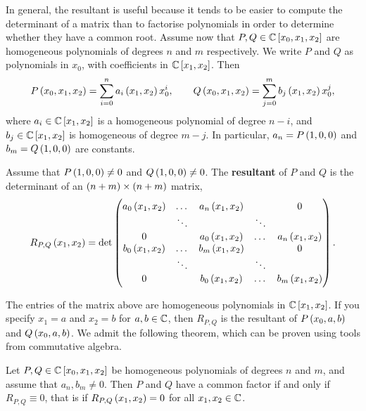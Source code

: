 
In general, the resultant is useful because it tends to be easier to compute the determinant of a matrix than to factorise polynomials in order to determine whether they have a common root. Assume now that $ P, Q \in \C\sbr{x_0, x_1, x_2} $ are homogeneous polynomials of degrees $ n $ and $ m $ respectively. We write $ P $ and $ Q $ as polynomials in $ x_0 $, with coefficients in $ \C\sbr{x_1, x_2} $. Then
$$ P\br{x_0, x_1, x_2} = \sum_{i = 0}^n a_i\br{x_1, x_2}x_0^i, \qquad Q\br{x_0, x_1, x_2} = \sum_{j = 0}^m b_j\br{x_1, x_2}x_0^j, $$
where $ a_i \in \C\sbr{x_1, x_2} $ is a homogeneous polynomial of degree $ n - i $, and $ b_j \in \C\sbr{x_1, x_2} $ is homogeneous of degree $ m - j $. In particular, $ a_n = P\br{1, 0, 0} $ and $ b_m = Q\br{1, 0, 0} $ are constants.

\begin{definition}
\label{def:9.5}
Assume that $ P\br{1, 0, 0} \ne 0 $ and $ Q\br{1, 0, 0} \ne 0 $. The \textbf{resultant} of $ P $ and $ Q $ is the determinant of an $ \br{n + m} \times \br{n + m} $ matrix,
$$ R_{P, Q}\br{x_1, x_2} = \det
\begin{pmatrix}
a_0\br{x_1, x_2} & \dots & a_n\br{x_1, x_2} & & 0 \\
& \ddots & & \ddots & \\
0 & & a_0\br{x_1, x_2} & \dots & a_n\br{x_1, x_2} \\
b_0\br{x_1, x_2} & \dots & b_m\br{x_1, x_2} & & 0 \\
& \ddots & & \ddots & \\
0 & & b_0\br{x_1, x_2} & \dots & b_m\br{x_1, x_2}
\end{pmatrix}.
$$
\end{definition}

The entries of the matrix above are homogeneous polynomials in $ \C\sbr{x_1, x_2} $. If you specify $ x_1 = a $ and $ x_2 = b $ for $ a, b \in \mathbb{C} $, then $ R_{P, Q} $ is the resultant of $ P\br{x_0, a, b} $ and $ Q\br{x_0, a, b} $. We admit the following theorem, which can be proven using tools from commutative algebra.

\begin{theorem}
\label{thm:9.6}
Let $ P, Q \in \C\sbr{x_0, x_1, x_2} $ be homogeneous polynomials of degrees $ n $ and $ m $, and assume that $ a_n, b_m \ne 0 $. Then $ P $ and $ Q $ have a common factor if and only if $ R_{P, Q} \equiv 0 $, that is if $ R_{P, Q}\br{x_1, x_2} = 0 $ for all $ x_1, x_2 \in \mathbb{C} $.
\end{theorem}

